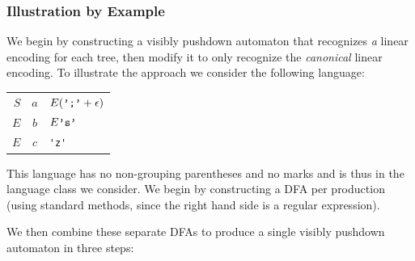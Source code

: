\documentclass[runningheads]{llncs}
\begin{document}
\subsubsection{Illustration by Example}

We begin by constructing a visibly pushdown automaton that recognizes \emph{a} linear encoding for each tree, then modify it to only recognize the \emph{canonical} linear encoding. To illustrate the approach we consider the following language:

\begin{center}
  \begin{tabular}{@{}r@{$\;->\;$}c@{\,:\;}l}
    \toprule
    $S$ & $a$ & $E(\verb|';'| + \epsilon)$ \\
    $E$ & $b$ & $E\verb|'s'|$ \\
    $E$ & $c$ & \verb|'z'| \\
    \bottomrule
  \end{tabular}
\end{center}

\noindent This language has no non-grouping parentheses and no marks and is thus in the language class we consider. We begin by constructing a DFA per production (using standard methods, since the right hand side is a regular expression).

\begin{center}
\end{center}

\noindent We then combine these separate DFAs to produce a single visibly pushdown automaton in three steps:
\end{document}
